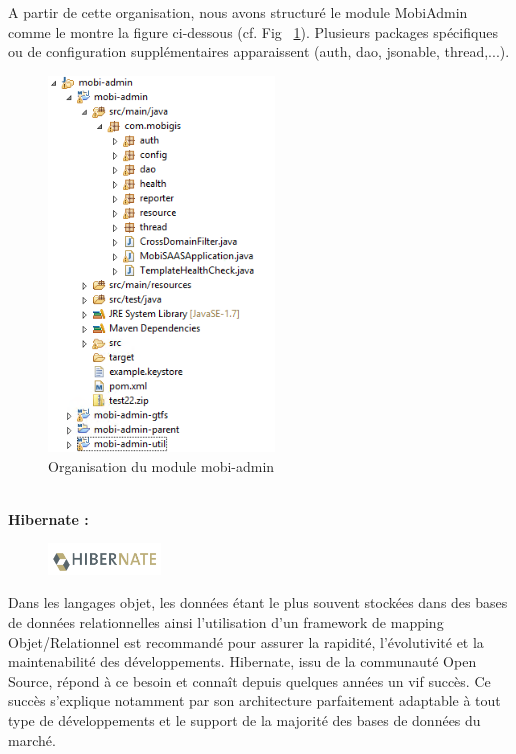 \begin{itemize}
A partir de cette organisation, nous avons structuré le module \og MobiAdmin \fg comme le montre la figure ci-dessous (cf. Fig ~\ref{Organisation_MobiAdmin}). 
Plusieurs packages spécifiques ou de configuration supplémentaires apparaissent (auth, dao, jsonable, thread,...). 
\\
\begin{figure}[h]
\centering
\includegraphics[width=6cm,heigth=6cm]{images/Package_explorer_MobiSAAS.PNG}
\caption{\label{Organisation_MobiAdmin}Organisation du module mobi-admin}
\end{figure} 

\\

\textbf{Hibernate :}

\begin{figure}
\centering
\includegraphics[width=3cm]{images/hibernate.png}
\end{figure}
\noindent Dans les langages objet, les données étant le plus souvent stockées dans des bases de données relationnelles ainsi l'utilisation d'un framework de mapping Objet/Relationnel est recommandé pour assurer la rapidité, l'évolutivité et la maintenabilité des développements. Hibernate, issu de la communauté Open Source, répond à ce besoin et connaît depuis quelques années un vif succès. Ce succès s'explique notamment par son architecture parfaitement adaptable à tout type de développements et le support de la majorité des bases de données du marché.\\


\end{itemize}
